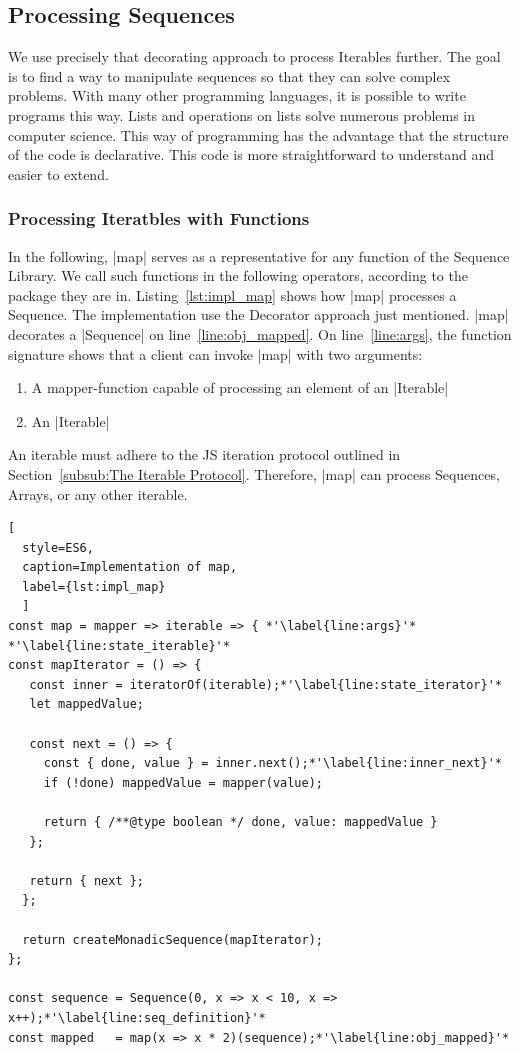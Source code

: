 \subsection{Processing Sequences}
\label{sec:Processing Sequences}
We use precisely that decorating approach to process Iterables further. 
The goal is to find a way to manipulate sequences so that they can solve 
complex problems. With many other programming languages, it is possible to write 
programs this way. Lists and operations on lists solve numerous problems in 
computer science. This way of programming has the advantage that the structure 
of the code is declarative. This code is more straightforward to understand 
and easier to extend.

\subsubsection{Processing Iteratbles with Functions}
\label{subsub:Processing Iteratbles with Functions}
In the following, |map| serves as a representative for any function of the
Sequence Library. We call such functions in the following operators,
according to the package they are in.
Listing~\ref{lst:impl_map} shows how |map| processes a Sequence. The 
implementation use the Decorator approach just mentioned. |map| decorates a
|Sequence| on line~\ref{line:obj_mapped}.
\newline
On line~\ref{line:args}, the function signature shows that a client can invoke 
|map| with two arguments:

\begin{enumerate}
  \item{A mapper-function capable of processing an element of an |Iterable|}
  \item{An |Iterable|}
\end{enumerate}

An iterable must adhere to the JS iteration protocol 
outlined in Section~\ref{subsub:The Iterable Protocol}. Therefore, |map| can 
process Sequences, Arrays, or any other iterable. 

\begin{lstlisting}[
  style=ES6, 
  caption=Implementation of map,
  label={lst:impl_map}
  ]
const map = mapper => iterable => { *'\label{line:args}'*
*'\label{line:state_iterable}'*
const mapIterator = () => {
   const inner = iteratorOf(iterable);*'\label{line:state_iterator}'*
   let mappedValue;
 
   const next = () => {
     const { done, value } = inner.next();*'\label{line:inner_next}'*
     if (!done) mappedValue = mapper(value);
 
     return { /**@type boolean */ done, value: mappedValue }
   };
 
   return { next };
  };
 
  return createMonadicSequence(mapIterator);
};

const sequence = Sequence(0, x => x < 10, x => x++);*'\label{line:seq_definition}'*
const mapped   = map(x => x * 2)(sequence);*'\label{line:obj_mapped}'*
\end{lstlisting}

